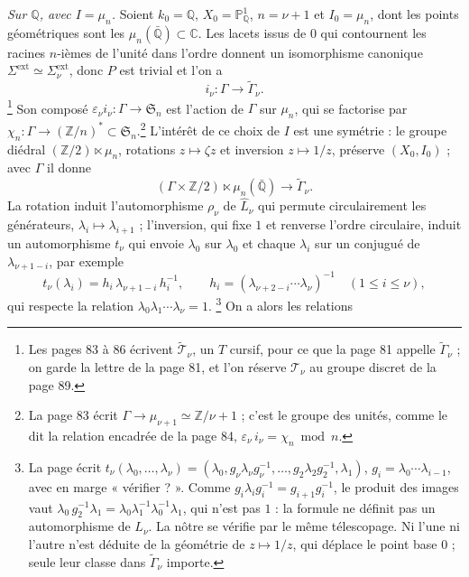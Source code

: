 \documentclass[11pt,a4paper]{article}
\begin{document}
\emph{Sur $\mathbb{Q}$, avec $I = \mu_{n}$.} Soient $k_{0} = \mathbb{Q}$, $X_{0} =
\mathbb{P}^{1}_{\mathbb{Q}}$, $n = \nu + 1$ et $I_{0} = \mu_{n}$, dont les points
géométriques sont les $\mu_{n}(\bar{\mathbb{Q}}) \subset \mathbb{C}$. Les lacets
issus de $0$ qui contournent les racines $n$-ièmes de l'unité dans l'ordre
donnent un isomorphisme canonique $\Sigma^{\mathrm{ext}} \simeq
\Sigma_{\nu}^{\mathrm{ext}}$, donc $P$ est trivial et l'on a
\[
i_{\nu} : \Gamma \longrightarrow \widetilde{\Gamma}_{\nu} .
\]
\footnote{Les pages 83 à 86 écrivent $\widetilde{\mathcal{T}}_{\nu}$, un $T$
cursif, pour ce que la page 81 appelle $\widetilde{\Gamma}_{\nu}$ ; on garde la
lettre de la page 81, et l'on réserve $\mathcal{T}_{\nu}$ au groupe discret de
la page 89.} Son composé $\varepsilon_{\nu} i_{\nu} : \Gamma \to
\mathfrak{S}_{n}$ est l'action de $\Gamma$ sur $\mu_{n}$, qui se factorise par
$\chi_{n} : \Gamma \to (\mathbb{Z}/n)^{*} \subset \mathfrak{S}_{n}$.\footnote{La
page 83 écrit $\Gamma \to \mu_{\nu+1} \simeq \mathbb{Z}/\nu{+}1$ ; c'est le
groupe des unités, comme le dit la relation encadrée de la page 84,
$\varepsilon_{\nu}\, i_{\nu} = \chi_{n} \bmod n$.} L'intérêt de ce choix de $I$
est une symétrie : le groupe diédral $(\mathbb{Z}/2) \ltimes \mu_{n}$, rotations
$z \mapsto \zeta z$ et inversion $z \mapsto 1/z$, préserve $(X_{0}, I_{0})$ ;
avec $\Gamma$ il donne
\[
(\Gamma \times \mathbb{Z}/2) \ltimes \mu_{n}(\bar{\mathbb{Q}}) \longrightarrow
\widetilde{\Gamma}_{\nu}.
\]
La rotation induit l'automorphisme $\rho_{\nu}$ de $\widehat{L}_{\nu}$ qui
permute circulairement les générateurs, $\lambda_{i} \mapsto \lambda_{i+1}$ ;
l'inversion, qui fixe $1$ et renverse l'ordre circulaire, induit un
automorphisme $t_{\nu}$ qui envoie $\lambda_{0}$ sur $\lambda_{0}$ et chaque
$\lambda_{i}$ sur un conjugué de $\lambda_{\nu+1-i}$, par exemple
\[
t_{\nu}(\lambda_{i}) = h_{i}\, \lambda_{\nu+1-i}\, h_{i}^{-1}, \qquad
h_{i} = (\lambda_{\nu+2-i} \cdots \lambda_{\nu})^{-1} \quad (1 \leqslant i \leqslant \nu),
\]
qui respecte la relation $\lambda_{0}\lambda_{1} \cdots \lambda_{\nu} = 1$.%
\footnote{La page écrit $t_{\nu}(\lambda_{0}, \ldots, \lambda_{\nu}) =
(\lambda_{0}, g_{\nu}\lambda_{\nu}g_{\nu}^{-1}, \ldots, g_{2}\lambda_{2}g_{2}^{-1},
\lambda_{1})$, $g_{i} = \lambda_{0} \cdots \lambda_{i-1}$, avec en marge
« vérifier ? ». Comme $g_{i}\lambda_{i}g_{i}^{-1} = g_{i+1}g_{i}^{-1}$, le
produit des images vaut $\lambda_{0}\, g_{2}^{-1}\lambda_{1} =
\lambda_{0}\lambda_{1}^{-1}\lambda_{0}^{-1}\lambda_{1}$, qui n'est pas $1$ : la
formule ne définit pas un automorphisme de $L_{\nu}$. La nôtre se vérifie par
le même télescopage. Ni l'une ni l'autre n'est déduite de la géométrie de
$z \mapsto 1/z$, qui déplace le point base $0$ ; seule leur classe dans
$\widetilde{\Gamma}_{\nu}$ importe.} On a alors les relations
\end{document}
